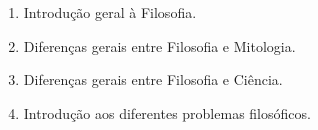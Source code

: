 \documentclass[
	article,			%
	12pt,				%
	twoside,			%
	a4paper,			%
	english,			%
	brazil,				%
	sumario=tradicional
]{plano}
\begin{document}
\begin{enumerate}





		\item Introdução geral à Filosofia.
		\item Diferenças gerais entre Filosofia e Mitologia.
		\item Diferenças gerais entre Filosofia e Ciência.
		\item Introdução aos diferentes problemas filosóficos.






\end{enumerate}
\end{document}
